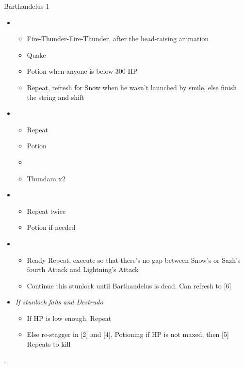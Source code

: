 \begin{paracol}{2}
\begin{battle}{Barthandelus 1}
\begin{itemize}
			\item \second
			      \begin{itemize}
				      \item Fire-Thunder-Fire-Thunder, after the head-raising animation
				      \item Quake
				      \item Potion when anyone is below 300 HP
				      \item Repeat, refresh for Snow when he wasn't launched by smile, else finish the string and shift
			      \end{itemize}
			\item \third
			      \begin{itemize}
				      \item Repeat
				      \item Potion
				      \item \stagger
				      \item Thundara x2
			      \end{itemize}
			\item \second
			      \begin{itemize}
				      \item Repeat twice
				      \item Potion if needed
			      \end{itemize}
			\item \fourth
			      \begin{itemize}
				      \item Ready Repeat, execute so that there's no gap between Snow's or Sazh's fourth Attack and Lightning's Attack
				      \item Continue this stunlock until Barthandelus is dead. Can refresh to [6]
			      \end{itemize}
			\item \textit{If stunlock fails and Destrudo}
			      \begin{itemize}
				      \item If HP is low enough, Repeat
				      \item Else re-stagger in [2] and [4], Potioning if HP is not maxed, then [5] Repeats to kill
			      \end{itemize}
		\end{itemize}

	\end{battle}
	\switchcolumn
	\renewcommand{\first}{[1] Strike Team (\com/\syn/\com)}
	\renewcommand{\second}{[2] Tri-Disaster (\rav/\rav/\rav)}
	\renewcommand{\third}{[3] Strategic Warfare (\com/\syn/\sen)}
	\renewcommand{\fourth}{[4] Tri-Disaster (\rav/\rav/\rav)}
	\renewcommand{\fifth}{[5] Cerberus (\com/\com/\com)}
	\renewcommand{\sixth}{[6] Cerberus (\com/\com/\com)}
	.


\end{paracol}
